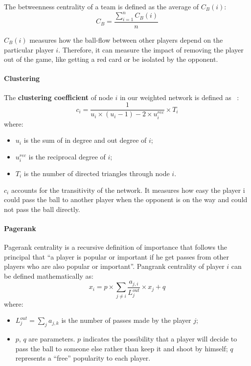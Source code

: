 \documentclass[12pt]{mcmthesis}
\begin{document}
	The betweenness centrality of a team is defined as the average of $C_B (i)$:
	\begin{equation}\label{between2}
		C_B = \frac{\sum_{i = 1}^{n} C_B (i)}{n}
	\end{equation}

	$C_B (i)$ measures how the ball-flow between other players depend on the particular player $i$. Therefore, it can measure the impact of removing the player out of the game, like getting a red card or be isolated by the opponent.

	\paragraph{Clustering}
	The \textbf{clustering coefficient} of node $i$ in our weighted network is defined as ~\cite{pena2012network}:
	\begin{equation}\label{eq:cluster}
	c_{i} = \frac{1}{u_i \times \left( u_i - 1\right) - 2 \times u_i^{rec}} \times T_i
	\end{equation}
	where:
	\begin{itemize}
		\item $u_i$ is the sum of in degree and out degree of $i$;
		\item $u_i^{rec}$ is the reciprocal degree of $i$;
		\item $T_i$ is the number of directed triangles through node $i$.
	\end{itemize}

	$c_i$ accounts for the transitivity of the network. It measures how easy the player i could pass the ball to another player when the opponent is on the way and could not pass the ball directly.

	\paragraph{Pagerank}
	Pagerank centrality is a recursive definition of importance that follows the principal that ``a player is popular or important if he get passes from other players who are also popular or important''. Pangrank centrality of player $i$ can be defined mathematically as:
	\begin{equation}\label{eq:pagerank}
		x_i = p \times \sum_{j \neq i} \frac{a_{j, i}}{L_j^{out}} \times x_j +q
	\end{equation}
	where:
	\begin{itemize}
		\item $L_j^{out} = \sum_{j} a_{j, k}$ is the number of passes made by the player $j$;
		\item $p$, $q$ are parameters. $p$ indicates the possibility that a player will decide to pass the ball to someone else rather than keep it and shoot by himself; $q$ represents a ``free'' popularity to each player.
	\end{itemize}
\end{document}
